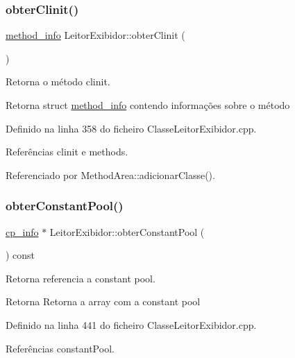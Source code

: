 \subsubsection{\texorpdfstring{obter\+Clinit()}{obterClinit()}}
{\footnotesize\ttfamily \hyperlink{structmethod__info}{method\+\_\+info} Leitor\+Exibidor\+::obter\+Clinit (\begin{DoxyParamCaption}{ }\end{DoxyParamCaption})}



Retorna o método clinit. 

\begin{DoxyReturn}{Retorna}
struct \hyperlink{structmethod__info}{method\+\_\+info} contendo informações sobre o método 
\end{DoxyReturn}


Definido na linha 358 do ficheiro Classe\+Leitor\+Exibidor.\+cpp.



Referências clinit e methods.



Referenciado por Method\+Area\+::adicionar\+Classe().

\mbox{\label{classLeitorExibidor_ab286b420bb915f3444ec78a003f4c25c}} 
\subsubsection{\texorpdfstring{obter\+Constant\+Pool()}{obterConstantPool()}}
{\footnotesize\ttfamily \hyperlink{structcp__info}{cp\+\_\+info} $\ast$ Leitor\+Exibidor\+::obter\+Constant\+Pool (\begin{DoxyParamCaption}{ }\end{DoxyParamCaption}) const}



Retorna referencia a constant pool. 

\begin{DoxyReturn}{Retorna}
Retorna a array com a constant pool 
\end{DoxyReturn}


Definido na linha 441 do ficheiro Classe\+Leitor\+Exibidor.\+cpp.



Referências constant\+Pool.



